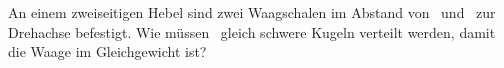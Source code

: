 An einem zweiseitigen Hebel sind zwei Waagschalen im Abstand von \aWaO\ und \bWaO\ zur Drehachse befestigt. Wie müssen \NWaO\ gleich schwere Kugeln verteilt werden, damit die Waage im Gleichgewicht ist?
